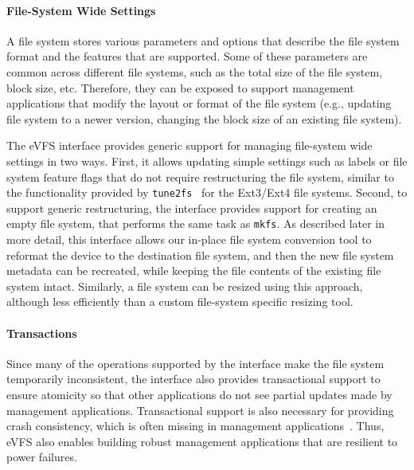 \paragraph{File-System Wide Settings} A file system stores various parameters and options that describe the file system format and the features that are supported. Some of these parameters are common across different file systems, such as the total size of the file system, block size, etc. Therefore, they can be exposed to support management applications that modify the layout or format of the file system (e.g., updating file system to a newer version, changing the block size of an existing file system).

The eVFS interface provides generic support for managing file-system wide settings in two ways. First, it allows updating simple settings such as labels or file system feature flags that do not require restructuring the file system, similar to the functionality provided by \texttt{tune2fs}~\cite{tso-e2fsprogs} for the Ext3/Ext4 file systems. Second, to support generic restructuring, the interface provides support for creating an empty file system, that performs the same task as \texttt{mkfs}. As described later in more detail, this interface allows our in-place file system conversion tool to reformat the device to the destination file system, and then the new file system metadata can be recreated, while keeping the file contents of the existing file system intact. Similarly, a file system can be resized using this approach, although less efficiently than a custom file-system specific resizing tool.

\paragraph{Transactions} Since many of the operations supported by the interface make the file system temporarily inconsistent, the interface also provides transactional support to ensure atomicity so that other applications do not see partial updates made by management applications. Transactional support is also necessary for providing crash consistency, which is often missing in management applications~\cite{gatla2018fsck}. Thus, eVFS also enables building robust management applications that are resilient to power failures.



